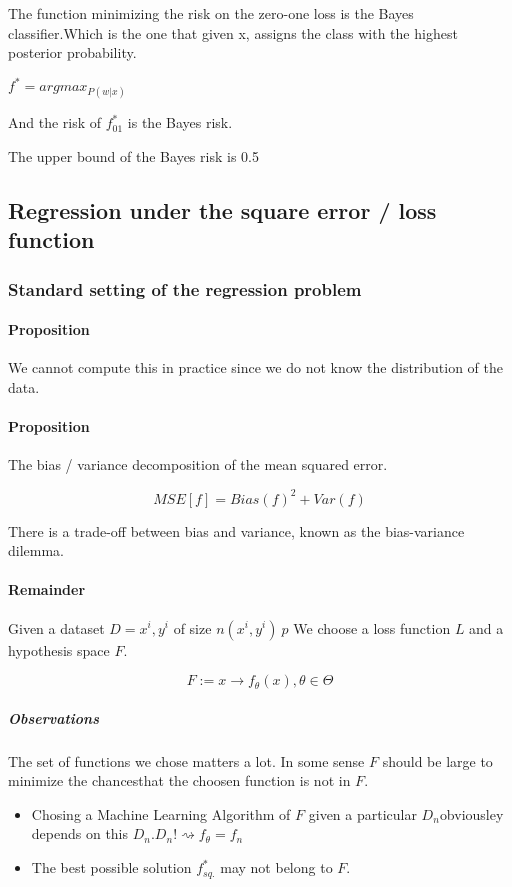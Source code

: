 The function minimizing the risk on the zero-one loss is the Bayes
classifier.Which is the one that given x, assigns the class with the
highest posterior probability.

\(f^* = argmax_{P(w | x)}\)

And the risk of \(f_{01}^*\) is the Bayes risk.

The upper bound of the Bayes risk is 0.5

\subsection{Regression under the square error / loss function}

\subsubsection{Standard setting of the regression problem}

\paragraph{Proposition}

We cannot compute this in practice since we do not know the distribution
of the data.

\paragraph{Proposition}

The bias / variance decomposition of the mean squared error.

\[MSE[f] = Bias(f)^2 + Var(f)
\]

There is a trade-off between bias and variance, known as the
bias-variance dilemma.

\paragraph{Remainder}

Given a dataset \(D = {x^i, y^i}\) of size \(n\)\((x^i, y^i)~p\) We
choose a loss function \(L\) and a hypothesis space \(F\).

\[F := { x \rightarrow f_\theta(x), \theta \in \Theta }
\]

\subparagraph{Observations}

The set of functions we chose matters a lot. In some sense \(F\) should
be large to minimize the chancesthat the choosen function is not in
\(F\).

\begin{itemize}
	\item
	      Chosing a Machine Learning Algorithm of \(F\) given a particular
	      \(D_n\)obviousley depends on this
	      \(D_n\).\(D_n! \rightsquigarrow f_\theta = f_n\)
	\item
	      The best possible solution \(f^*_{sq.}\) may not belong to \(F\).
\end{itemize}


